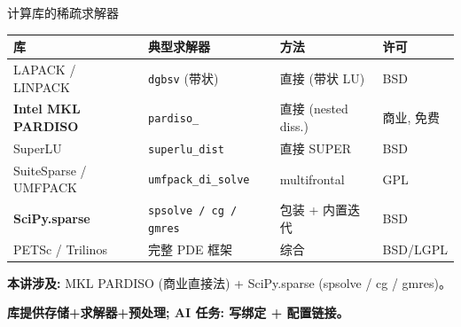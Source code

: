 \documentclass[12pt,aspectratio=169]{beamer}
\begin{document}
\begin{frame}[shrink]{计算库的稀疏求解器}

\small
\begin{center}
\renewcommand{\arraystretch}{1.15}
\setlength{\tabcolsep}{4pt}
\begin{tabular}{@{}l l l l@{}}
\toprule
\textbf{库} & \textbf{典型求解器} & \textbf{方法} & \textbf{许可} \\
\midrule
LAPACK / LINPACK         & \texttt{dgbsv} (带状)          & 直接 (带状 LU)   & BSD \\
\textbf{Intel MKL PARDISO} & \texttt{pardiso\_}          & 直接 (nested diss.) & 商业, 免费 \\
SuperLU                  & \texttt{superlu\_dist}        & 直接 SUPER       & BSD \\
SuiteSparse / UMFPACK    & \texttt{umfpack\_di\_solve}   & multifrontal     & GPL \\
\textbf{SciPy.sparse}    & \texttt{spsolve / cg / gmres} & 包装 + 内置迭代   & BSD \\
PETSc / Trilinos         & 完整 PDE 框架                 & 综合              & BSD/LGPL \\
\bottomrule
\end{tabular}
\end{center}
\normalsize

\vspace{4pt}
\small \textbf{本讲涉及:} MKL PARDISO (商业直接法) + SciPy.sparse (spsolve / cg / gmres)。

\vspace{2pt}
\begin{center}
\small \textbf{库提供存储+求解器+预处理; AI 任务: 写绑定 + 配置链接。}
\end{center}
\end{frame}
\end{document}

